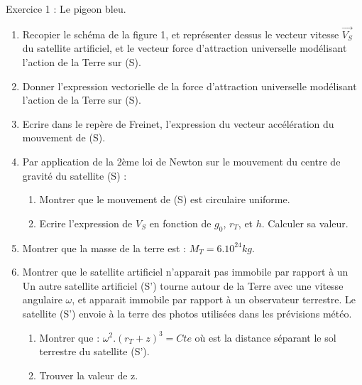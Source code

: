 \documentclass[12pt, french]{article}
\begin{document}
\begin{Box2}{Exercice 1 : Le pigeon bleu.}
\begin{itemize}
\end{itemize}

\begin{enumerate}

	\item Recopier le schéma de la figure 1, et représenter dessus le vecteur vitesse $\vec{V_S}$ du
satellite artificiel, et le vecteur force d’attraction universelle modélisant l’action
de la Terre sur (S).

\item Donner l’expression vectorielle de la force d’attraction universelle modélisant
l’action de la Terre sur (S).

\item Ecrire dans le repère de Freinet, l’expression du vecteur accélération du
mouvement de (S).

\item Par application de la 2ème loi de Newton sur le mouvement du centre de gravité
du satellite (S) :
\begin{enumerate}
	\item Montrer que le mouvement de (S) est circulaire uniforme.
	\item Ecrire l’expression de $V_S$ en fonction de $g_0$, $r_T$, et $h$. Calculer sa valeur.
\end{enumerate}

\item Montrer que la masse de la terre est : $M_T = 6.10^{24} kg$.
\item Montrer que le satellite artificiel n’apparait pas immobile par rapport à un
Un autre satellite artificiel (S’) tourne autour de la Terre avec une vitesse
angulaire $\omega$, et apparait immobile par rapport à un observateur terrestre.
Le satellite (S’) envoie à la terre des photos utilisées dans les prévisions météo.
\begin{enumerate}
	\item Montrer que : $\omega^2.(r_T + z)^3 = Cte$ où est la distance séparant le sol terrestre du
satellite (S’).
\item  Trouver la valeur de z.
\end{enumerate}


\end{enumerate}


   \end{Box2}
\end{document}
